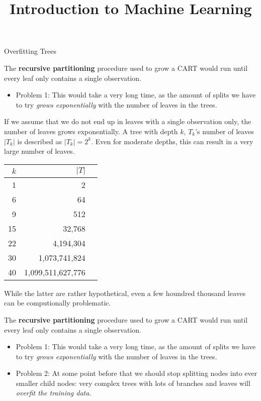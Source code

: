\documentclass[11pt,compress,t,notes=noshow, xcolor=table]{beamer}
\title{Introduction to Machine Learning}
\institute{\href{https://compstat-lmu.github.io/lecture_i2ml/}{compstat-lmu.github.io/lecture\_i2ml}}
\date{}
\begin{document}
\sloppy

\begin{vbframe}{Overfitting Trees}

The \textbf{recursive partitioning} procedure used to grow a CART would run until every leaf only contains a single observation. 
\begin{itemize}
\item Problem 1: This would take a very long time, as the amount of splits we have to try \emph{grows exponentially} with the number of leaves in the trees.
\end{itemize}

If we assume that we do not end up in leaves with a single observation only, the number of leaves grows exponentially. A tree with depth $k$, $T_k$'s number of leaves $|T_k|$ is described as $|T_k| = 2^k$. Even for moderate depths, this can result in a very large number of leaves.

\begin{table}[ht]
\centering
\tiny
\begin{tabular}{rrr}
  \hline
  $k$ & $|T|$ \\ 
  \hline
  1 & 2 \\ 
  6 & 64 \\ 
  9 & 512 \\ 
  15 & 32,768 \\ 
  22 & 4,194,304 \\ 
  30 & 1,073,741,824 \\ 
  40 & 1,099,511,627,776 \\ 
   \hline
\end{tabular}
\end{table}

While the latter are rather hypothetical, even a few houndred thousand leaves can be computionally problematic.

\framebreak

The \textbf{recursive partitioning} procedure used to grow a CART would run until every leaf only contains a single observation. 
\begin{itemize}
\item Problem 1: This would take a very long time, as the amount of splits we have to try \emph{grows exponentially} with the number of leaves in the trees.
\item Problem 2: At some point before that we should stop splitting nodes into ever smaller child nodes: very complex trees with lots of branches and leaves will \emph{overfit the training data.}


\end{itemize}
\end{vbframe}
\end{document}
